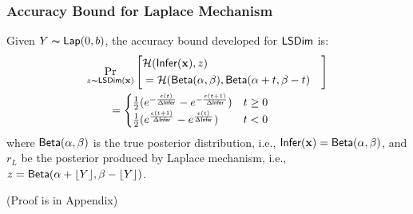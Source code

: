 \documentclass{article}
\begin{document}
\subsubsection{Accuracy Bound for Laplace Mechanism}
\label{subsec_accuracy_lap}
\begin{lem}
\label{lem_acc_lap}
Given $Y \thicksim \mathsf{Lap}(0, b)$, the accuracy bound developed for $\mathsf{LSDim}$ is:
\begin{align*}
&
\lapmechPr{\dataobs}{
\begin{aligned}
\lefteqn{\hellinger(\bysinfer(\dataobs), z )}\\ 
&= \hellinger(\betad(\alpha, \beta), \betad(\alpha + t, \beta - t)
\end{aligned}
}
\\
&\qquad = 
\begin{cases}
\frac{1}{2} (e^{- \frac{\epsilon (t)}{\Delta \bysinfer}} - e^{- \frac{\epsilon (t + 1)}{\Delta \bysinfer}}) &  t \geq 0\\
\frac{1}{2} (e^{\frac{\epsilon (t + 1)}{\Delta \bysinfer}} - e^{\frac{\epsilon (t)}{\Delta \bysinfer}}) & t < 0
\end{cases}
\end{align*}
where $\mathsf{Beta}(\alpha, \beta)$ is the true posterior distribution, i.e., $\mathsf{Infer}(\textbf{x}) = \mathsf{Beta}(\alpha, \beta)$, and $r_L$ be the posterior produced by Laplace mechanism, i.e., $z = \mathsf{Beta}(\alpha + \lfloor Y \rfloor, \beta - \lfloor Y \rfloor)$.
\end{lem}
(Proof is in Appendix)
\end{document}
